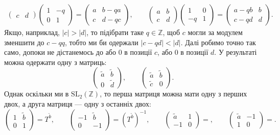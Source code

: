 \documentclass{math_library}
\begin{document}
\begin{example}
\begin{align*}
\begin{pmatrix}
c & d
\end{pmatrix} \begin{pmatrix}
1 & -q \\
0 & 1
\end{pmatrix} = \begin{pmatrix}
a & b-qa \\
c & d-qc
\end{pmatrix}, \qquad
\begin{pmatrix}
a & b \\
c & d
\end{pmatrix} \begin{pmatrix}
1 & 0 \\
-q & 1
\end{pmatrix} = \begin{pmatrix}
a-qb & b \\
c-qd & d
\end{pmatrix}.
\end{align*}
Якщо, наприклад, $|c| > |d|$, то підібрати таке $q \in \mathbb{Z}$, щоб $c$ могли за модулем зменшити до $c-qq$, тобто ми би одержали $|c-qd| < |d|$. Далі робимо точно так само, допоки не дістанемось до або $0$ в позиції $c$, або $0$ в позиції $d$. У результаті можна одержати одну з матриць:
\[
\begin{pmatrix}
\tilde{a} & \tilde{b} \\
0 & \tilde{d}
\end{pmatrix}, \qquad \begin{pmatrix}
\tilde{a} & \tilde{b} \\
\tilde{c} & 0
\end{pmatrix}.
\]
Однак оскільки ми в $\mathrm{SL}_2(\mathbb{Z})$, то перша матриця можна мати одну з перших двох, а друга матриця --- одну з останніх двох:
\[
\begin{pmatrix}
1 & \tilde{b} \\
0 & 1
\end{pmatrix} = T^{\tilde{b}}, \qquad \begin{pmatrix}
-1 & \tilde{b} \\
0 & -1
\end{pmatrix} = (T^{\tilde{b}})^{-1}, \qquad \begin{pmatrix}
\tilde{a} & 1 \\
-1 & 0
\end{pmatrix} = , \qquad \begin{pmatrix}
\tilde{a} & -1 \\
1 & 0
\end{pmatrix} =.
\]
\end{example}
\end{document}
